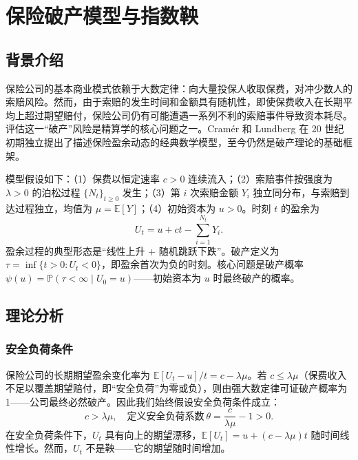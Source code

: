 \section{保险破产模型与指数鞅}

\subsection{背景介绍}

保险公司的基本商业模式依赖于大数定律：向大量投保人收取保费，对冲少数人的索赔风险。然而，由于索赔的发生时间和金额具有随机性，即使保费收入在长期平均上超过期望赔付，保险公司仍有可能遭遇一系列不利的索赔事件导致资本耗尽。评估这一``破产''风险是精算学的核心问题之一。Cram\'{e}r 和 Lundberg 在 20 世纪初期独立提出了描述保险盈余动态的经典数学模型\cite{asmussen2010ruin}，至今仍然是破产理论的基础框架。

模型假设如下：（1）保费以恒定速率 $c > 0$ 连续流入；（2）索赔事件按强度为 $\lambda > 0$ 的泊松过程 $\{N_t\}_{t \geqslant 0}$ 发生；（3）第 $i$ 次索赔金额 $Y_i$ 独立同分布，与索赔到达过程独立，均值为 $\mu = \mathbb{E}[Y]$；（4）初始资本为 $u > 0$。时刻 $t$ 的盈余为
\begin{equation}\label{eq:surplus}
  U_t = u + c t - \sum_{i=1}^{N_t} Y_i.
\end{equation}
盈余过程的典型形态是``线性上升 + 随机跳跃下跌''。破产定义为 $\tau = \inf\{t > 0: U_t < 0\}$，即盈余首次为负的时刻。核心问题是破产概率 $\psi(u) = \mathbb{P}(\tau < \infty \mid U_0 = u)$——初始资本为 $u$ 时最终破产的概率。

\subsection{理论分析}

\subsubsection{安全负荷条件}

保险公司的长期期望盈余变化率为 $\mathbb{E}[U_t - u]/t = c - \lambda \mu$。若 $c \leqslant \lambda \mu$（保费收入不足以覆盖期望赔付，即``安全负荷''为零或负），则由强大数定律可证破产概率为 1——公司最终必然破产。因此我们始终假设安全负荷条件成立：
\begin{equation}\label{eq:safety}
  c > \lambda \mu, \quad \text{定义安全负荷系数}\ \theta = \frac{c}{\lambda \mu} - 1 > 0.
\end{equation}
在安全负荷条件下，$U_t$ 具有向上的期望漂移，$\mathbb{E}[U_t] = u + (c - \lambda\mu)t$ 随时间线性增长。然而，$U_t$ 不是鞅——它的期望随时间增加。

